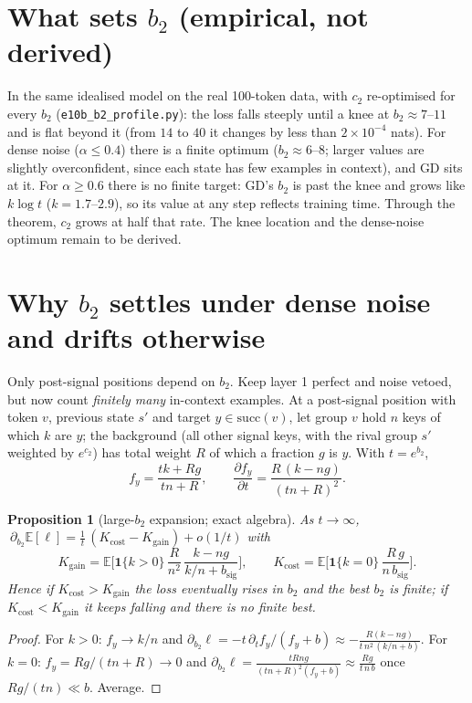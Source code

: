 \documentclass[11pt]{article}
\newtheorem{proposition}{Proposition}
\theoremstyle{remark}\newtheorem{remark}{Remark}
\newcommand{\1}{\mathbf{1}}
\begin{document}
\section{What sets $b_2$ (empirical, not derived)}
In the same idealised model on the real 100-token data, with $c_2$ re-optimised for every $b_2$
(\texttt{e10b\_b2\_profile.py}): the loss falls steeply until a knee at $b_2\approx7$--$11$ and is
flat beyond it (from $14$ to $40$ it changes by less than $2\times10^{-4}$ nats). For dense noise
($\alpha\le0.4$) there is a finite optimum ($b_2\approx6$--$8$; larger values are slightly
overconfident, since each state has few examples in context), and GD sits at it. For
$\alpha\ge0.6$ there is no finite target: GD's $b_2$ is past the knee and grows like
$k\log t$ ($k=1.7$--$2.9$), so its value at any step reflects training time. Through the theorem,
$c_2$ grows at half that rate. The knee location and the dense-noise optimum remain to be derived.

\section{Why $b_2$ settles under dense noise and drifts otherwise}
Only post-signal positions depend on $b_2$. Keep layer 1 perfect and noise vetoed, but now
count \emph{finitely many} in-context examples. At a post-signal position with token $v$, previous
state $s'$ and target $y\in\mathrm{succ}(v)$, let group $v$ hold $n$ keys of which $k$ are $y$; the
background (all other signal keys, with the rival group $s'$ weighted by $e^{c_2}$) has total weight
$R$ of which a fraction $g$ is $y$. With $t=e^{b_2}$,
\[
f_y=\frac{tk+Rg}{tn+R},\qquad \frac{\partial f_y}{\partial t}=\frac{R\,(k-ng)}{(tn+R)^2}.
\]
\begin{proposition}[large-$b_2$ expansion; exact algebra]
As $t\to\infty$, $\ \partial_{b_2}\mathbb E[\ell]=\frac1t\,(K_{\mathrm{cost}}-K_{\mathrm{gain}})+o(1/t)$ with
\[
K_{\mathrm{gain}}=\mathbb E\Big[\1\{k>0\}\,\frac{R}{n^2}\,\frac{k-ng}{k/n+b_{\mathrm{sig}}}\Big],\qquad
K_{\mathrm{cost}}=\mathbb E\Big[\1\{k=0\}\,\frac{R\,g}{n\,b_{\mathrm{sig}}}\Big].
\]
Hence if $K_{\mathrm{cost}}>K_{\mathrm{gain}}$ the loss eventually \emph{rises} in $b_2$ and the best
$b_2$ is finite; if $K_{\mathrm{cost}}<K_{\mathrm{gain}}$ it keeps falling and there is no finite best.
\end{proposition}
\begin{proof}
For $k>0$: $f_y\to k/n$ and $\partial_{b_2}\ell=-t\,\partial_tf_y/(f_y+b)\approx-\frac{R(k-ng)}{t\,n^2\,(k/n+b)}$.
For $k=0$: $f_y=Rg/(tn+R)\to0$ and $\partial_{b_2}\ell=\frac{tRng}{(tn+R)^2(f_y+b)}\approx\frac{Rg}{t\,n\,b}$
once $Rg/(tn)\ll b$. Average.
\end{proof}
\end{document}
